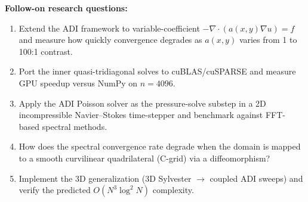 \documentclass[11pt]{article}
\begin{document}
\noindent\textbf{Follow-on research questions:}
\begin{enumerate}[leftmargin=1.6em,itemsep=0.2em,topsep=0.2em,label=Q\arabic*.]
\item Extend the ADI framework to variable-coefficient $-\nabla\cdot(a(x,y)\nabla u) = f$ and measure how quickly convergence degrades as $a(x,y)$ varies from 1 to 100:1 contrast.
\item Port the inner quasi-tridiagonal solves to cuBLAS/cuSPARSE and measure GPU speedup versus NumPy on $n=4096$.
\item Apply the ADI Poisson solver as the pressure-solve substep in a 2D incompressible Navier--Stokes time-stepper and benchmark against FFT-based spectral methods.
\item How does the spectral convergence rate degrade when the domain is mapped to a smooth curvilinear quadrilateral (C-grid) via a diffeomorphism?
\item Implement the 3D generalization (3D Sylvester $\rightarrow$ coupled ADI sweeps) and verify the predicted $O(N^3\log^2 N)$ complexity.
\end{enumerate}
\end{document}
